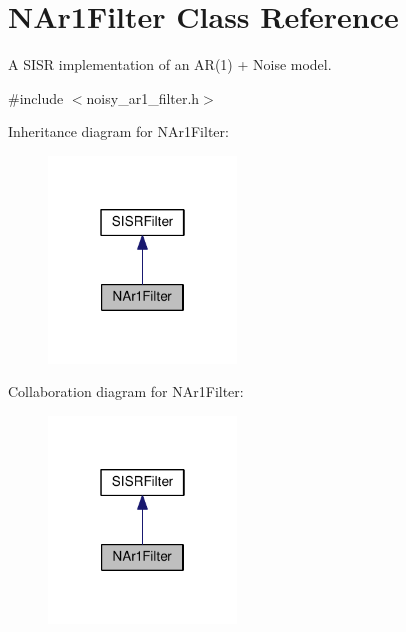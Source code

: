 \hypertarget{classNAr1Filter}{}\section{N\+Ar1\+Filter Class Reference}
\label{classNAr1Filter}


A S\+I\+SR implementation of an A\+R(1) + Noise model.  




{\ttfamily \#include $<$noisy\+\_\+ar1\+\_\+filter.\+h$>$}



Inheritance diagram for N\+Ar1\+Filter\+:\nopagebreak
\begin{figure}[H]
\begin{center}
\leavevmode
\includegraphics[width=142pt]{classNAr1Filter__inherit__graph}
\end{center}
\end{figure}


Collaboration diagram for N\+Ar1\+Filter\+:\nopagebreak
\begin{figure}[H]
\begin{center}
\leavevmode
\includegraphics[width=142pt]{classNAr1Filter__coll__graph}
\end{center}
\end{figure}
